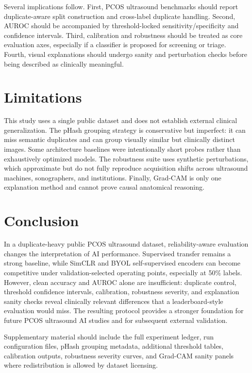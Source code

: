\documentclass[pdflatex,sn-mathphys-num]{sn-jnl}
\theoremstyle{thmstyleone}
\theoremstyle{thmstyletwo}
\theoremstyle{thmstylethree}
\begin{document}
Several implications follow. First, PCOS ultrasound benchmarks should report duplicate-aware split construction and cross-label duplicate handling. Second, AUROC should be accompanied by threshold-locked sensitivity/specificity and confidence intervals. Third, calibration and robustness should be treated as core evaluation axes, especially if a classifier is proposed for screening or triage. Fourth, visual explanations should undergo sanity and perturbation checks before being described as clinically meaningful.

\section{Limitations}\label{sec:limitations}

This study uses a single public dataset and does not establish external clinical generalization. The pHash grouping strategy is conservative but imperfect: it can miss semantic duplicates and can group visually similar but clinically distinct images. Some architecture baselines were intentionally short probes rather than exhaustively optimized models. The robustness suite uses synthetic perturbations, which approximate but do not fully reproduce acquisition shifts across ultrasound machines, sonographers, and institutions. Finally, Grad-CAM is only one explanation method and cannot prove causal anatomical reasoning.

\section{Conclusion}\label{sec:conclusion}

In a duplicate-heavy public PCOS ultrasound dataset, reliability-aware evaluation changes the interpretation of AI performance. Supervised transfer remains a strong baseline, while SimCLR and BYOL self-supervised encoders can become competitive under validation-selected operating points, especially at 50\% labels. However, clean accuracy and AUROC alone are insufficient: duplicate control, threshold confidence intervals, calibration, robustness severity, and explanation sanity checks reveal clinically relevant differences that a leaderboard-style evaluation would miss. The resulting protocol provides a stronger foundation for future PCOS ultrasound AI studies and for subsequent external validation.

\backmatter


Supplementary material should include the full experiment ledger, run configuration files, pHash grouping metadata, additional threshold tables, calibration outputs, robustness severity curves, and Grad-CAM sanity panels where redistribution is allowed by dataset licensing.
\end{document}
